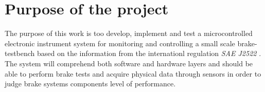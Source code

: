 	\section{Purpose of the project}
		The purpose of this work is too develop, implement and test a microcontrolled electronic instrument system for monitoring and controlling a small scale brake-testbench based on the information from the internationl regulation \textit{SAE J2522} \cite{sae}. The system will comprehend both software and hardware layers and should be able to perform brake tests and acquire physical data through sensors in order to judge brake systems components level of performance.
